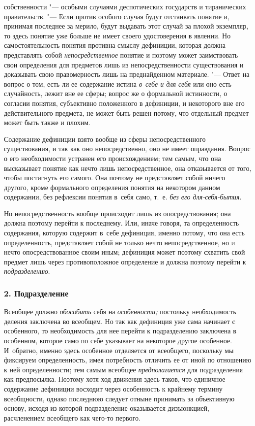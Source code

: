 собственности "--- особыми случаями деспотических государств и
тиранических правительств. "--- Если против особого случая
будут отстаивать понятие и, принимая последнее за мерило, будут выдавать
этот случай за плохой экземпляр, то здесь понятие уже больше не имеет
своего удостоверения в явлении. Но самостоятельность понятия противна
смыслу дефиниции, которая должна представлять собой
{\em непосредственное}
понятие и поэтому может заимствовать свои определения для
предметов лишь из непосредственности существования и доказывать свою
правомерность лишь на преднайденном материале. "--- Ответ на
вопрос о том, есть ли ее содержание истина
{\em в~себе и для себя}
или оно есть случайность, лежит вне ее сферы; вопрос же о
формальной истинности, о согласии понятия, субъективно положенного в
дефиниции, и некоторого вне его действительного предмета, не может быть
решен потому, что отдельный предмет может быть также и плохим.

Содержание дефиниции взято вообще из сферы непосредственного
существования, и так как оно непосредственно, оно не имеет оправдания.
Вопрос о его необходимости устранен его происхождением; тем самым, что она
высказывает понятие как нечто лишь непосредственное, она отказывается от
того, чтобы постигнуть его самого. Она поэтому не представляет собой ничего
другого, кроме формального определения понятия на некотором данном
содержании, без рефлексии понятия в~себя само, т.~е.
{\em без его для-себя-бытия}.

Но непосредственность вообще происходит лишь из
опосредствования; она должна поэтому перейти к последнему. Или,
иначе говоря, та определенность содержания, которую содержит
в~себе дефиниция, именно потому, что она есть определенность, представляет
собой не только нечто непосредственное, но и нечто опосредствованное своим
иным; дефиниция может поэтому схватить свой предмет лишь через
противоположное определение и должна поэтому перейти к
{\em подразделению}.


\subsubsection[2. Подразделение]{\bfseries 2. Подразделение}

Всеобщее должно {\em обособить} себя на {\em особенности;}
постольку необходимость деления заключена во всеобщем. Но так
как дефиниция уже сама начинает с особенного, то необходимость для нее
перейти к подразделению заключена в особенном, которое само по себе
указывает на некоторое другое особенное. И~обратно, именно здесь особенное
отделяется от всеобщего, поскольку мы фиксируем определенность, имея
потребность отличить ее от иной по отношению к ней определенности; тем
самым всеобщее {\em предполагается}
для подразделения как предпосылка. Поэтому хотя ход движения
здесь таков, что единичное содержание дефиниции восходит через особенность
к крайнему термину всеобщности, однако последнюю следует отныне принимать
за объективную основу, исходя из которой подразделение оказывается
дизъюнкцией, расчленением всеобщего как чего-то первого.

